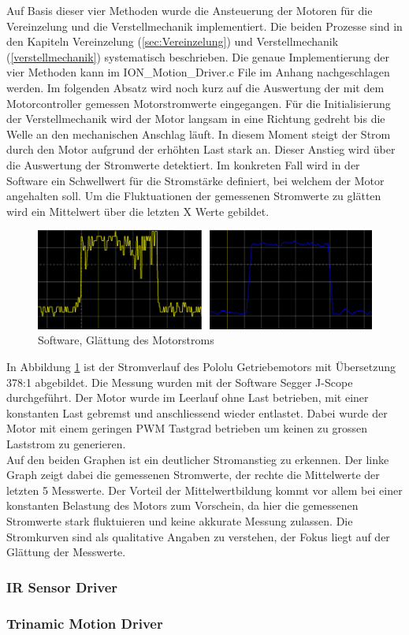 Auf Basis dieser vier Methoden wurde die Ansteuerung der Motoren für die Vereinzelung und die Verstellmechanik implementiert. Die beiden Prozesse sind in den Kapiteln Vereinzelung (\ref{sec:Vereinzelung}) und Verstellmechanik (\ref{verstellmechanik}) systematisch beschrieben. Die genaue Implementierung der vier Methoden kann im ION\_Motion\_Driver.c File im Anhang nachgeschlagen werden. Im folgenden Absatz wird noch kurz auf die Auswertung der mit dem Motorcontroller gemessen Motorstromwerte eingegangen.\newline
Für die Initialisierung der Verstellmechanik wird der Motor langsam in eine Richtung gedreht bis die Welle an den mechanischen Anschlag läuft. In diesem Moment steigt der Strom durch den Motor aufgrund der erhöhten Last stark an. Dieser Anstieg wird über die Auswertung der Stromwerte detektiert. Im konkreten Fall wird in der Software ein Schwellwert für die Stromstärke definiert, bei welchem der Motor angehalten soll. Um die Fluktuationen der gemessenen Stromwerte zu glätten wird ein Mittelwert über die letzten X Werte gebildet.


\begin{figure}[H]
	\includegraphics[width=1\textwidth]{Illustrationen/6-Umsetzung/ION_Motion_Strommessung.png}
	\caption{Software, Glättung des Motorstroms}
	\label{fig:ION_Motion_Strommessung}
\end{figure}

In Abbildung \ref{fig:ION_Motion_Strommessung} ist der Stromverlauf des Pololu Getriebemotors mit Übersetzung 378:1 abgebildet. Die Messung wurden mit der Software Segger J-Scope durchgeführt. Der Motor wurde im Leerlauf ohne Last betrieben, mit einer konstanten Last gebremst und anschliessend wieder entlastet. Dabei wurde der Motor mit einem geringen PWM Tastgrad betrieben um keinen zu grossen Laststrom zu generieren.\\
Auf den beiden Graphen ist ein deutlicher Stromanstieg zu erkennen. Der linke Graph zeigt dabei die gemessenen Stromwerte, der rechte die Mittelwerte der letzten 5 Messwerte. Der Vorteil der Mittelwertbildung kommt vor allem bei einer konstanten Belastung des Motors zum Vorschein, da hier die gemessenen Stromwerte stark fluktuieren und keine akkurate Messung zulassen. Die Stromkurven sind als qualitative Angaben zu verstehen, der Fokus liegt auf der Glättung der Messwerte.


\subsubsection{IR Sensor Driver}

\subsubsection{Trinamic Motion Driver}

